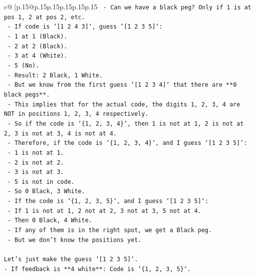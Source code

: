 \documentclass{article}
\begin{document}
{\begin{supertabular}{c@{$\;$}|p{.15\linewidth}@{}p{.15\linewidth}p{.15\linewidth}p{.15\linewidth}p{.15\linewidth}p{.15\linewidth}}
{{{\texttt{  {-} Can we have a black peg? Only if 1 is at pos 1, 2 at pos 2, etc.} \\
\texttt{  {-} If code is `{[}1 2 4 3{]}`, guess `{[}1 2 3 5{]}`:} \\
\texttt{    {-} 1 at 1 (Black).} \\
\texttt{    {-} 2 at 2 (Black).} \\
\texttt{    {-} 3 at 4 (White).} \\
\texttt{    {-} 5 (No).} \\
\texttt{    {-} Result: 2 Black, 1 White.} \\
\texttt{  {-} But we know from the first guess `{[}1 2 3 4{]}` that there are **0 black pegs**.} \\
\texttt{  {-} This implies that for the actual code, the digits 1, 2, 3, 4 are NOT in positions 1, 2, 3, 4 respectively.} \\
\texttt{  {-} So if the code is `\{1, 2, 3, 4\}`, then 1 is not at 1, 2 is not at 2, 3 is not at 3, 4 is not at 4.} \\
\texttt{  {-} Therefore, if the code is `\{1, 2, 3, 4\}`, and I guess `{[}1 2 3 5{]}`:} \\
\texttt{    {-} 1 is not at 1.} \\
\texttt{    {-} 2 is not at 2.} \\
\texttt{    {-} 3 is not at 3.} \\
\texttt{    {-} 5 is not in code.} \\
\texttt{    {-} So 0 Black, 3 White.} \\
\texttt{  {-} If the code is `\{1, 2, 3, 5\}`, and I guess `{[}1 2 3 5{]}`:} \\
\texttt{    {-} If 1 is not at 1, 2 not at 2, 3 not at 3, 5 not at 4.} \\
\texttt{    {-} Then 0 Black, 4 White.} \\
\texttt{    {-} If any of them is in the right spot, we get a Black peg.} \\
\texttt{    {-} But we don't know the positions yet.} \\
\\ 
\texttt{Let's just make the guess `{[}1 2 3 5{]}`.} \\
\texttt{{-} If feedback is **4 white**: Code is `\{1, 2, 3, 5\}`.} \\
}}}
\end{supertabular}}
\end{document}
